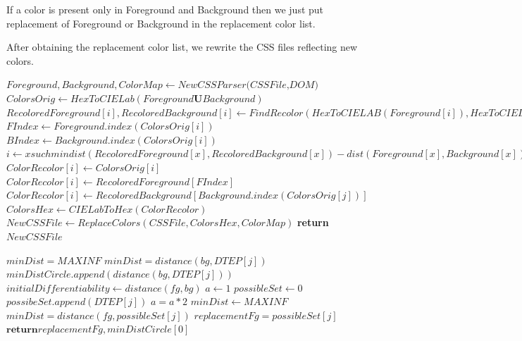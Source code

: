 If a color is present only in Foreground and Background then we just put replacement of Foreground or Background in the replacement color list. 

After obtaining the replacement color list, we rewrite the CSS files reflecting new colors. 

\begin{algorithm}[!htb]
\caption{FBRecolor}\label{Our Approach}
\begin{algorithmic}[1]
\State ${Foreground,Background,ColorMap} \gets \textit{NewCSSParser(CSSFile,DOM)}$
\State $ColorsOrig \gets HexToCIELab(Foreground \textbf{U} Background)$
	\State $RecoloredForeground[i], RecoloredBackground[i] \gets FindRecolor(HexToCIELAB(Foreground[i]),HexToCIELAB(Background[i]))$
\EndFor
{}
	 \State $FIndex \gets Foreground.index(ColorsOrig[i])$
			\State $BIndex \gets Background.index(ColorsOrig[i])$
	\State $i \gets x such min{dist(RecoloredForeground[x],RecoloredBackground[x])-dist(Foreground[x],Background[x])+ dist(RecoloredForeground[x],Foreground[x]),x \in{FIndex,BIndex} }$
			\State $ColorRecolor[i] \gets ColorsOrig[i]$
		\Else
		\State $ColorRecolor[i] \gets RecoloredForeground[FIndex]$
		\EndIf	
	\EndIf
	\State $ColorRecolor[i] \gets RecoloredBackground[Background.index(ColorsOrig[j])]$
\EndFor
\State $ColorsHex \gets CIELabToHex(ColorRecolor)$
\State $NewCSSFile \gets ReplaceColors(CSSFile, ColorsHex, ColorMap)$
\State \textbf{return} $NewCSSFile$
\EndProcedure
{}
\end{algorithmic}
\end{algorithm}


\begin{algorithm}[!htb]
\caption{FBRecolor:continue}\label{FBRecolor:continue}
\begin{algorithmic}[1]
\State $minDist = MAXINF$
		\State $minDist = distance(bg,DTEP[j])$
	\EndIf
\EndFor
{}
		\State $minDistCircle .append(distance(bg,DTEP[j]))$
	\EndIf
\EndFor
\State $initialDifferentiability \gets distance(fg,bg)$
\State $a \gets 1$
\State $possibleSet \gets 0$
			\State $possibeSet.append(DTEP[j])$
		\EndIf
		\State $a = a*2$
	\EndFor
\EndWhile
\State $minDist \gets MAXINF$
		\State $minDist = distance(fg,possibleSet[j])$
		\State $replacementFg = possibleSet[j]$
	\EndIf
\EndFor
\State $\textbf{return} replacementFg,minDistCircle[0]$
\EndProcedure
\end{algorithmic}
\end{algorithm}



